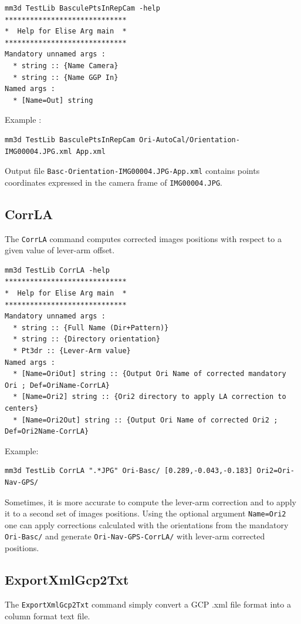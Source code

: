\begin{verbatim}
mm3d TestLib BasculePtsInRepCam -help
*****************************
*  Help for Elise Arg main  *
*****************************
Mandatory unnamed args : 
  * string :: {Name Camera}
  * string :: {Name GGP In}
Named args : 
  * [Name=Out] string
\end{verbatim}

Example :
\begin{verbatim}
mm3d TestLib BasculePtsInRepCam Ori-AutoCal/Orientation-IMG00004.JPG.xml App.xml
\end{verbatim}

Output file {\tt Basc-Orientation-IMG00004.JPG-App.xml} contains points coordinates expressed in the camera frame of {\tt IMG00004.JPG}.

\subsection{CorrLA}
The {\tt CorrLA} command computes corrected images positions with respect to a given value of lever-arm offset.

\begin{verbatim}
mm3d TestLib CorrLA -help
*****************************
*  Help for Elise Arg main  *
*****************************
Mandatory unnamed args : 
  * string :: {Full Name (Dir+Pattern)}
  * string :: {Directory orientation}
  * Pt3dr :: {Lever-Arm value}
Named args : 
  * [Name=OriOut] string :: {Output Ori Name of corrected mandatory Ori ; Def=OriName-CorrLA}
  * [Name=Ori2] string :: {Ori2 directory to apply LA correction to centers}
  * [Name=Ori2Out] string :: {Output Ori Name of corrected Ori2 ; Def=Ori2Name-CorrLA}
\end{verbatim}

Example:
\begin{verbatim}
mm3d TestLib CorrLA ".*JPG" Ori-Basc/ [0.289,-0.043,-0.183] Ori2=Ori-Nav-GPS/
\end{verbatim}

Sometimes, it is more accurate to compute the lever-arm correction and to apply it to a second set of images positions.
Using the optional argument {\tt Name=Ori2} one can apply corrections calculated with the orientations from the mandatory {\tt Ori-Basc/} and generate {\tt Ori-Nav-GPS-CorrLA/} with
lever-arm corrected positions. 

\subsection{ExportXmlGcp2Txt}
The {\tt ExportXmlGcp2Txt} command simply convert a GCP .xml file format into a column format text file.

